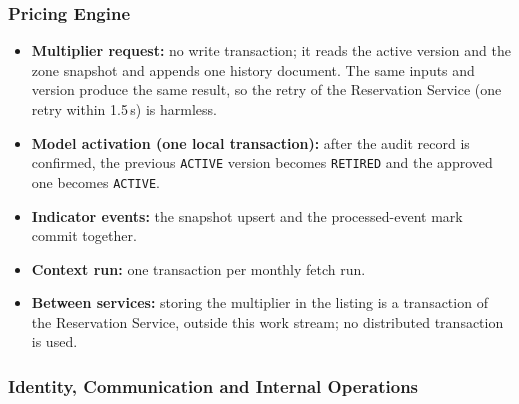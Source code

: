 \begingroup
\setlength{\emergencystretch}{3em}
\subsubsection{Pricing Engine}
\label{sec:price-boundaries}

\begin{itemize}
  \item \textbf{Multiplier request:} no write transaction; it reads the
    active version and the zone snapshot and appends one history document.
    The same inputs and version produce the same result, so the retry of the
    Reservation Service (one retry within 1.5\,s) is harmless.
  \item \textbf{Model activation (one local transaction):} after the audit
    record is confirmed, the previous \texttt{ACTIVE} version becomes
    \texttt{RETIRED} and the approved one becomes \texttt{ACTIVE}.
  \item \textbf{Indicator events:} the snapshot upsert and the
    processed-event mark commit together.
  \item \textbf{Context run:} one transaction per monthly fetch run.
  \item \textbf{Between services:} storing the multiplier in the listing is
    a transaction of the Reservation Service, outside this work stream; no
    distributed transaction is used.
\end{itemize}
\endgroup

\begingroup
\setlength{\emergencystretch}{3em}
\subsubsection{Identity, Communication and Internal Operations}
\label{sec:id-boundaries}

